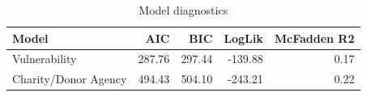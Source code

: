 \begin{table}[ht]
\centering
\begin{tabular}{lrrrr}
  \hline
Model & AIC & BIC & LogLik & McFadden R2 \\ 
  \hline
Vulnerability & 287.76 & 297.44 & -139.88 & 0.17 \\ 
  Charity/Donor Agency & 494.43 & 504.10 & -243.21 & 0.22 \\ 
   \hline
\end{tabular}
\caption{Model diagnostics} 
\end{table}
